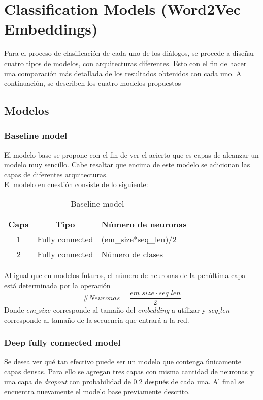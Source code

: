 \section{Classification Models (Word2Vec Embeddings)}
Para el proceso de clasificación de cada uno de los diálogos, se procede a diseñar cuatro tipos de modelos, con arquitecturas diferentes. Esto con el fin de hacer una comparación más detallada de los resultados obtenidos con cada uno. A continuación, se describen los cuatro modelos propuestos

\subsection{Modelos}
\subsubsection{Baseline model}
El modelo base se propone con el fin de ver el acierto que es capas de alcanzar un modelo muy sencillo. Cabe resaltar que encima de este modelo se adicionan las capas de diferentes arquitecturas.\\

El modelo en cuestión consiste de lo siguiente:

\begin{table}[H]
\centering
\caption{Baseline model}
\label{tab:baseline_1}
\begin{tabular}{|c|l|l|}
\hline
\textbf{Capa} & \multicolumn{1}{c|}{\textbf{Tipo}} & \multicolumn{1}{c|}{\textbf{Número de neuronas}} \\ \hline
1             & Fully connected                    & (em\_size*seq\_len)/2                            \\ \hline
2             & Fully connected                    & Número de clases                                 \\ \hline
\end{tabular}
\end{table}

Al igual que en modelos futuros, el número de neuronas de la penúltima capa está determinada por la operación
\begin{equation}
    \# Neuronas = \frac{em\_size \cdot seq\_len}{2}
\end{equation}
Donde $em\_size$ corresponde al tamaño del \textit{embedding} a utilizar y $seq\_len$ corresponde al tamaño de la secuencia que entrará a la red.

\subsubsection{Deep fully connected model}
Se desea ver qué tan efectivo puede ser un modelo que contenga únicamente capas densas. Para ello se agregan tres capas con misma cantidad de neuronas y una capa de \textit{dropout} con probabilidad de 0.2 después de cada una. Al final se encuentra nuevamente el modelo base previamente descrito.

